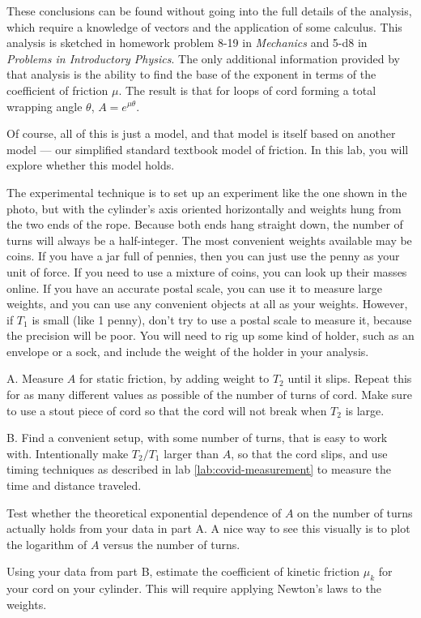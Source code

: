 These conclusions can be found without going into the full details of the analysis,
which require a knowledge of vectors and the application of some calculus. This
analysis is sketched in homework problem 8-19 in \emph{Mechanics} and 5-d8 in \emph{Problems in Introductory Physics}.
The only additional information provided by that analysis is the ability to find the
base of the exponent in terms of the coefficient of friction $\mu$. The result is
that for loops of cord forming a total wrapping angle $\theta$, $A=e^{\mu\theta}$.

Of course, all of this is just a model, and that model is itself based on another model --- our
simplified standard textbook model of friction. In this lab, you will explore whether this
model holds.

\observations

The experimental technique is to set up an experiment like the one shown in the photo,
but with the cylinder's axis oriented horizontally and weights hung from the two ends
of the rope. Because both ends hang straight down, the number of turns will always be
a half-integer. The most convenient weights available may be coins. If you have a
jar full of pennies, then you can just use the penny as your unit of force. If you
need to use a mixture of coins, you can look up their masses online. If you have an
accurate postal scale, you can use it to measure large weights, and you can use
any convenient objects at all as your weights. However, if $T_1$ is small (like 1 penny),
don't try to use a postal scale to measure it, because the precision will be poor.
You will need to rig up some kind of holder, such as an envelope or a sock, and
include the weight of the holder in your analysis.

A. Measure $A$ for static friction, by adding weight to $T_2$ until it slips.
Repeat this for as many different values as possible of the number of turns of cord.
Make sure to use a stout piece of cord so that the cord will not break when $T_2$ is
large.

B. Find a convenient setup, with some number of turns, that is easy to work with.
Intentionally make $T_2/T_1$ larger than $A$, so that the cord slips, and use 
timing techniques as described in lab \ref{lab:covid-measurement} to measure the
time and distance traveled.

\analysis

Test whether the theoretical exponential dependence of $A$ on the number of turns
actually holds from your data in part A. A nice way to see this visually is
to plot the logarithm of $A$ versus the number of turns.

Using your data from part B, estimate the coefficient of kinetic friction
$\mu_k$ for your cord on your cylinder. This will require applying Newton's
laws to the weights.


